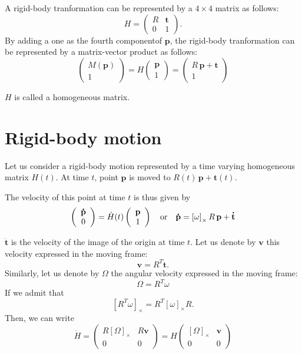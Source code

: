 \documentclass{article}
\newcommand\vect[1]{\mathbf{#1}}
\newcommand\trans{\mathbf{t}}
\newcommand\dtrans{\mathbf{\dot{t}}}
\begin{document}
A rigid-body tranformation can be represented by a $4\times4$ matrix as follows:
$$
H = \left(\begin{array}{cc}
  R & \trans\\
  0 & 1
\end{array}\right).
$$
By adding a one as the fourth componentof $\vect{p}$, the rigid-body tranformation can be represented by a matrix-vector product as follows:
$$
\left(\begin{array}{c}M(\vect{p})\\1\end{array}\right) = H\left(\begin{array}{c}\vect{p}\\1\end{array}\right) = \left(\begin{array}{c}R\,\vect{p}+\trans\\1\end{array}\right)
$$

$H$ is called a homogeneous matrix.
      
\section{Rigid-body motion}

Let us consider a rigid-body motion represented by a time varying homogeneous matrix $H(t)$.
At time $t$, point $\vect{p}$ is moved to $R(t)\,\vect{p}+\trans(t)$.

The velocity of this point at time $t$ is thus given by
$$
\left(\begin{array}{c}\vect{\dot{p}}\\0\end{array}\right) = \dot{H}(t)\left(\begin{array}{c}\vect{p}\\1\end{array}\right)\\
\ \ \ \mbox{or}\ \ \ \vect{\dot{p}} = \left[\omega\right]_{\times} R\,\vect{p}+\dtrans
$$

$\dtrans$ is the velocity of the image of the origin at time $t$. Let us denote by $\vect{v}$ this velocity expressed in the moving frame:
$$
\vect{v} = R^T\dtrans.
$$
Similarly, let us denote by $\Omega$ the angular velocity expressed in the moving frame:
$$
\Omega = R^T \omega
$$
If we admit that
$$
\left[R^T\omega\right]_{\times} = R^T\left[\omega\right]_{\times} R.
$$
Then, we can write
\begin{equation}\label{eq:diff-SE3}
\dot{H} = \left(\begin{array}{cc}R \left[\Omega\right]_{\times} & R\vect{v}\\0 & 0\end{array}\right)=
  H \left(\begin{array}{cc} \left[\Omega\right]_{\times} & \vect{v}\\0 & 0\end{array}\right)
\end{equation}
\end{document}
